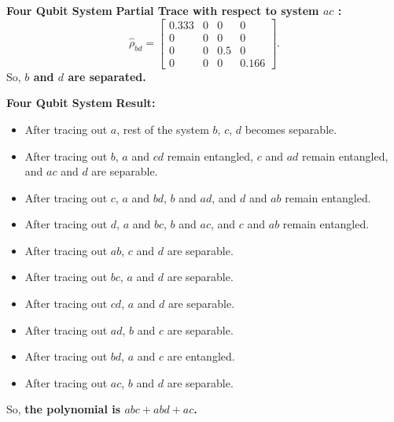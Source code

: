 \documentclass[usenames,dvipsnames]{beamer}
\begin{document}
		\begin{frame}{\textbf{Four Qubit System}}
			\textbf{Partial Trace with respect to system $ac$ :}
			\begin{equation*}
				\hat{\rho}_{bd} = \left[\begin{matrix}0.333 & 0 & 0 & 0\\0 & 0 & 0 & 0\\0 & 0 & 0.5 & 0\\0 & 0 & 0 & 0.166\end{matrix}\right]
				.
			\end{equation*}
		So, \textbf{$b$ and $d$ are separated.}
		\end{frame}
		
		\begin{frame}{\textbf{Four Qubit System}}
			\textbf{Result:}
			\begin{itemize}
				\item After tracing out $a$, rest of the system $b$, $c$, $d$ becomes separable.
				\item After tracing out $b$, $a$ and $cd$ remain entangled, $c$ and $ad$ remain entangled, and $ac$ and $d$ are separable.
				\item After tracing out $c$, $a$ and $bd$, $b$ and $ad$, and $d$ and $ab$ remain entangled.
				\item After tracing out $d$, $a$ and $bc$, $b$ and $ac$, and $c$ and $ab$ remain entangled.
				\item After tracing out $ab$, $c$ and $d$ are separable.
				\item After tracing out $bc$, $a$ and $d$ are separable.
				\item After tracing out $cd$, $a$ and $d$ are separable.
				\item After tracing out $ad$, $b$ and $c$ are separable.
				\item After tracing out $bd$, $a$ and $c$ are entangled.
				\item After tracing out $ac$, $b$ and $d$ are separable.
			\end{itemize}
		So, \textbf{the polynomial is $abc + abd + ac$.}
		\end{frame}
\end{document}
